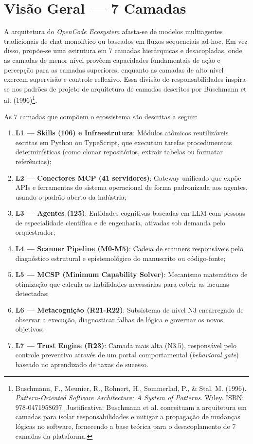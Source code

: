 \documentclass[12pt,a4paper,oneside]{abntex2}
\begin{document}
\section{Visão Geral — 7 Camadas}

A arquitetura do \textit{OpenCode Ecosystem} afasta-se de modelos multiagentes tradicionais de chat monolítico ou baseados em fluxos sequenciais ad-hoc. Em vez disso, propõe-se uma estrutura em 7 camadas hierárquicas e desacopladas, onde as camadas de menor nível provêem capacidades fundamentais de ação e percepção para as camadas superiores, enquanto as camadas de alto nível exercem supervisão e controle reflexivo. Essa divisão de responsabilidades inspira-se nos padrões de projeto de arquitetura de camadas descritos por Buschmann et al. (1996)\footnote{Buschmann, F., Meunier, R., Rohnert, H., Sommerlad, P., \& Stal, M. (1996). \textit{Pattern-Oriented Software Architecture: A System of Patterns}. Wiley. ISBN: 978-0471958697. Justificativa: Buschmann et al. conceituam a arquitetura em camadas para isolar responsabilidades e mitigar a propagação de mudanças lógicas no software, fornecendo a base teórica para o desacoplamento de 7 camadas da plataforma.}.

As 7 camadas que compõem o ecossistema são descritas a seguir:

\begin{enumerate}
    \item \textbf{L1 — Skills (106) e Infraestrutura}: Módulos atômicos reutilizáveis escritas em Python ou TypeScript, que executam tarefas procedimentais determinísticas (como clonar repositórios, extrair tabelas ou formatar referências);
    \item \textbf{L2 — Conectores MCP (41 servidores)}: Gateway unificado que expõe APIs e ferramentas do sistema operacional de forma padronizada aos agentes, usando o padrão aberto da indústria;
    \item \textbf{L3 — Agentes (125)}: Entidades cognitivas baseadas em LLM com pessoas de especialidade científica e de engenharia, ativadas sob demanda pelo orquestrador;
    \item \textbf{L4 — Scanner Pipeline (M0-M5)}: Cadeia de scanners responsáveis pelo diagnóstico estrutural e epistemológico do manuscrito ou código-fonte;
    \item \textbf{L5 — MCSP (Minimum Capability Solver)}: Mecanismo matemático de otimização que calcula as habilidades necessárias para cobrir as lacunas detectadas;
    \item \textbf{L6 — Metacognição (R21-R22)}: Subsistema de nível N3 encarregado de observar a execução, diagnosticar falhas de lógica e governar os novos objetivos;
    \item \textbf{L7 — Trust Engine (R23)}: Camada mais alta (N3.5), responsável pelo controle preventivo através de um portal comportamental (\textit{behavioral gate}) baseado no aprendizado de taxas de sucesso.
\end{enumerate}
\end{document}
